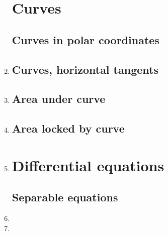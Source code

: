 \documentclass{article}
\begin{document}
\begin{enumerate}
\section{Curves}
\subsection{Curves in polar coordinates}
\item 

\subsection{Curves, horizontal tangents}
\item 


\subsection{Area under curve}
\item 
\subsection{Area locked by curve}
\item 


\section{Differential equations}
\subsection{Separable equations}
\item 

\item 



\end{enumerate}
\end{document}
